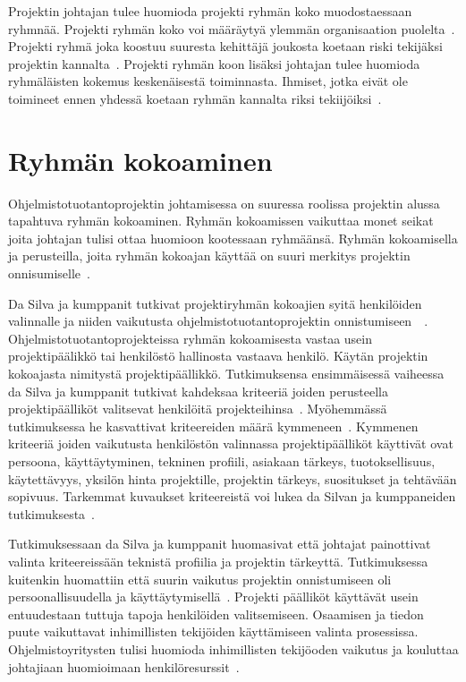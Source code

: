 \documentclass[finnish]{tktltiki2}
\theoremstyle{definition}
\theoremstyle{remark}
\begin{document}
Projektin johtajan tulee huomioda projekti ryhmän koko muodostaessaan ryhmnää. Projekti ryhmän koko voi määräytyä ylemmän organisaation puolelta~\cite{McLeod:2011:FAS:1978802.1978803}. Projekti ryhmä joka koostuu suuresta kehittäjä joukosta koetaan riski tekijäksi projektin kannalta~\cite{McLeod:2011:FAS:1978802.1978803}. Projekti ryhmän koon lisäksi johtajan tulee huomioda ryhmäläisten kokemus keskenäisestä toiminnasta. Ihmiset, jotka eivät ole toimineet ennen yhdessä koetaan ryhmän kannalta riksi tekiijöiksi~\cite{McLeod:2011:FAS:1978802.1978803}.



\section{Ryhmän kokoaminen}


Ohjelmistotuotantoprojektin johtamisessa on suuressa roolissa projektin alussa tapahtuva ryhmän kokoaminen. Ryhmän kokoamissen vaikuttaa monet seikat joita johtajan tulisi ottaa huomioon kootessaan ryhmäänsä. Ryhmän kokoamisella ja perusteilla, joita ryhmän kokoajan käyttää on suuri merkitys projektin onnisumiselle~\cite{daSilva2012}. 

Da Silva ja kumppanit tutkivat projektiryhmän kokoajien syitä henkilöiden valinnalle ja niiden vaikutusta ohjelmistotuotantoprojektin onnistumiseen~\cite{daSilva2012}~\cite{francca2009quantitative}. Ohjelmistotuotantoprojekteissa ryhmän kokoamisesta vastaa usein projektipäälikkö tai henkilöstö hallinosta vastaava henkilö. Käytän projektin kokoajasta nimitystä projektipäällikkö. Tutkimuksensa ensimmäisessä vaiheessa da Silva ja kumppanit tutkivat kahdeksaa kriteeriä joiden perusteella projektipäälliköt valitsevat henkilöitä projekteihinsa~\cite{francca2009quantitative}. Myöhemmässä tutkimuksessa he kasvattivat kriteereiden määrä kymmeneen~\cite{daSilva2012}. Kymmenen kriteeriä joiden vaikutusta henkilöstön valinnassa projektipäälliköt käyttivät ovat persoona, käyttäytyminen, tekninen profiili, asiakaan tärkeys, tuotoksellisuus, käytettävyys, yksilön hinta projektille, projektin tärkeys, suositukset ja tehtävään sopivuus. Tarkemmat kuvaukset kriteereistä voi lukea da Silvan ja kumppaneiden tutkimuksesta~\cite{daSilva2012}.

Tutkimuksessaan da Silva ja kumppanit huomasivat että johtajat painottivat valinta kriteereissään teknistä profiilia ja  projektin tärkeyttä. Tutkimuksessa kuitenkin huomattiin että suurin vaikutus projektin onnistumiseen oli persoonallisuudella ja käyttäytymisellä~\cite{daSilva2012}. Projekti päälliköt käyttävät usein entuudestaan tuttuja tapoja henkilöiden valitsemiseen. Osaamisen ja tiedon puute vaikuttavat inhimillisten tekijöiden käyttämiseen valinta prosessissa. Ohjelmistoyritysten tulisi huomioda inhimillisten tekijöoden vaikutus ja kouluttaa johtajiaan huomioimaan henkilöresurssit~\cite{daSilva2012}. 
\end{document}
